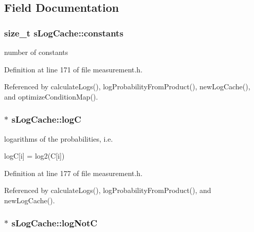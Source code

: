 \subsection{\-Field \-Documentation}
\hypertarget{structsLogCache_a06855ad644ec7343d2952cb079d83cd1}{
\subsubsection[{constants}]{\setlength{\rightskip}{0pt plus 5cm}size\-\_\-t {\bf s\-Log\-Cache\-::constants}}}\label{structsLogCache_a06855ad644ec7343d2952cb079d83cd1}


number of constants 



\-Definition at line 171 of file measurement.\-h.



\-Referenced by calculate\-Logs(), log\-Probability\-From\-Product(), new\-Log\-Cache(), and optimize\-Condition\-Map().

\hypertarget{structsLogCache_ac1a2fe56f678e4b2be3b56f9b6c04163}{
\subsubsection[{log\-C}]{$\ast$ {\bf s\-Log\-Cache\-::log\-C}}}\label{structsLogCache_ac1a2fe56f678e4b2be3b56f9b6c04163}


logarithms of the probabilities, i.\-e. 

log\-C\mbox{[}i\mbox{]} = log2(\-C\mbox{[}i\mbox{]}) 

\-Definition at line 177 of file measurement.\-h.



\-Referenced by calculate\-Logs(), log\-Probability\-From\-Product(), and new\-Log\-Cache().

\hypertarget{structsLogCache_aa9bfdee3aa5ff16f6ef8e3bef6da8f9c}{
\subsubsection[{log\-Not\-C}]{$\ast$ {\bf s\-Log\-Cache\-::log\-Not\-C}}}\label{structsLogCache_aa9bfdee3aa5ff16f6ef8e3bef6da8f9c}


